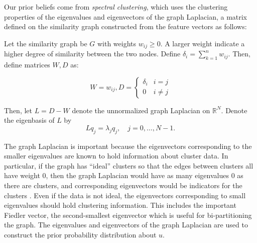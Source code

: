 \documentclass{siamart1116}
\begin{document}
Our prior beliefs come from \textit{spectral clustering}, which uses the clustering properties of the eigenvalues and eigenvectors of the graph Laplacian, a matrix defined on the similarity graph constructed from the feature vectors as follows:

Let the similarity graph be $G$ with weights $w_{ij} \ge 0$. A larger weight indicate a higher degree of similarity between the two nodes. Define $\delta_i = \sum_{k=1}^n w_{ij}$. Then, define matrices $W, D$ as:

\[W = w_{ij}, D = \begin{cases} 
\delta_i    & i = j \\
0           & i \neq j 
\end{cases}\]

Then, let $L = D - W$ denote the unnormalized graph Laplacian on $\mathbb{R}^N$. Denote the eigenbasis of $L$ by
\begin{equation}
\label{eqn:laplacian}
Lq_j = \lambda_j q_j,\quad j=0,\ldots,N-1.
\end{equation}

The graph Laplacian is important because the eigenvectors corresponding to the smaller eigenvalues are known to hold information about cluster data. In particular, if the graph has ``ideal'' clusters so that the edges between clusters all have weight 0, then the graph Laplacian would have as many eigenvalues 0 as there are clusters, and corresponding eigenvectors would be indicators for the clusters \cite{Spectral}. Even if the data is not ideal, the eigenvectors corresponding to small eigenvalues should hold clustering information. This includes the important Fiedler vector, the second-smallest eigenvector which is useful for bi-partitioning the graph. The eigenvalues and eigenvectors of the graph Laplacian are used to construct the prior probability distribution about $u$.

\end{document}
